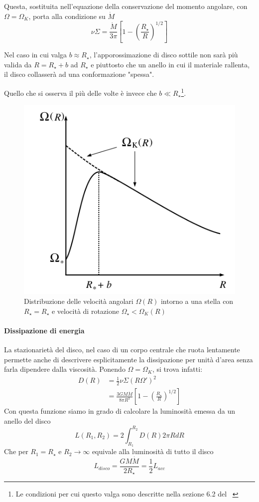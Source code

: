 \documentclass[a4paperbi]{article}
\begin{document}
	Questa, sostituita nell'equazione della conservazione del momento angolare, con $\Omega=\Omega_K$, porta alla condizione su $\dot{M}$
	\begin{equation}
		\nu\Sigma=\frac{\dot{M}}{3\pi}\left[1-\left(\frac{R_{\star}}{R}\right)^{1/2}\right]
	\end{equation}
	
	Nel caso in cui valga $b\approx R_{\star}$, l'apporossimazione di disco sottile non sarà più valida da $R=R_{\star}+b$ ad $R_{\star}$ e piuttosto che un anello in cui il materiale rallenta, il disco collasserà ad una conformazione "spessa".
	
	Quello che si osserva il più delle volte è invece che $b\ll R_{\star}$\footnote{Le condizioni per cui questo valga sono descritte nella sezione 6.2 del ~\cite{FrankKingRaineAccretionPower}}.	
	
	\begin{figure}[H]
		\centering
		\includegraphics[width=0.7\linewidth]{InnerRegionAngularVelocity}
		\caption{Distribuzione delle velocità angolari $\Omega(R)$ intorno a una stella con $R_{\star}=R_\star$ e velocità di rotazione $\Omega_{\star}<\Omega_K(R)$}
		\label{fig:InnerRegionAngularVelocity}
	\end{figure}
	
	\paragraph{Dissipazione di energia}
	La stazionarietà del disco, nel caso di un corpo centrale che ruota lentamente permette anche di descrivere esplicitamente la dissipazione per unità d'area senza farla dipendere dalla viscosità. Ponendo $\Omega=\Omega_K$, si trova infatti:
	\begin{align}
		D(R)&=\frac{1}{2}\nu\Sigma(R\Omega')^2
			\\&=\frac{3GM\dot{M}}{8\pi R^3}\left[1-\left(\frac{R_{\star}}{R}\right)^{1/2}\right]
	\end{align}	
	Con questa funzione siamo in grado di calcolare la luminosità emessa da un anello del disco
	\begin{equation}
		L(R_1,R_2)=2\int_{R_1}^{R_2}D(R)2\pi RdR
	\end{equation}
	Che per $R_1=R_{\star}$ e $R_2\to\infty$ equivale alla luminosità di tutto il disco
	\begin{equation}
		L_{disco}=\frac{GM\dot{M}}{2R_{\star}}=\frac{1}{2}L_{acc}
	\end{equation}
	
\end{document}
